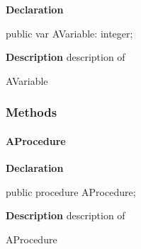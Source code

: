 \documentclass{report}
\begin{document}
\begin{list}{}{
\setlength{\itemindent}{0cm}
\setlength{\listparindent}{0cm}
\setlength{\leftmargin}{\evensidemargin}
\addtolength{\leftmargin}{\tmplength}
\settowidth{\labelsep}{X}
\addtolength{\leftmargin}{\labelsep}
\setlength{\labelwidth}{\tmplength}
}
\begin{flushleft}
\item[\textbf{Declaration}\hfill]
\begin{ttfamily}
public var AVariable: integer;\end{ttfamily}


\end{flushleft}
\par
\item[\textbf{Description}]
description of \begin{ttfamily}AVariable\end{ttfamily}

\end{list}
\subsubsection*{\large{\textbf{Methods}}\normalsize\hspace{1ex}\hfill}
\paragraph*{AProcedure}\hspace*{\fill}

\begin{list}{}{
\setlength{\itemindent}{0cm}
\setlength{\listparindent}{0cm}
\setlength{\leftmargin}{\evensidemargin}
\addtolength{\leftmargin}{\tmplength}
\settowidth{\labelsep}{X}
\addtolength{\leftmargin}{\labelsep}
\setlength{\labelwidth}{\tmplength}
}
\begin{flushleft}
\item[\textbf{Declaration}\hfill]
\begin{ttfamily}
public procedure AProcedure;\end{ttfamily}


\end{flushleft}
\par
\item[\textbf{Description}]
description of \begin{ttfamily}AProcedure\end{ttfamily}

\end{list}
\end{document}
